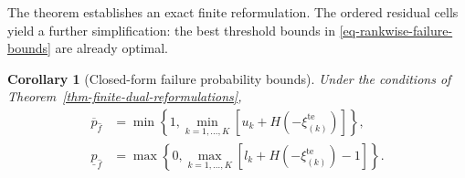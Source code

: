 \documentclass[review,11pt,3p,authoryear,nopreprintline]{elsarticle}
\newtheorem{corollary}{Corollary}
\begin{document}
The theorem establishes an exact finite reformulation. The ordered residual cells yield a further simplification: the best threshold bounds in \eqref{eq-rankwise-failure-bounds} are already optimal.

\begin{corollary}[Closed-form failure probability bounds]
  \label{thm-closed-form-bounds}
  Under the conditions of Theorem~\ref{thm-finite-dual-reformulations},
  \begin{align}
    \overline p_{\hat f}
    &=\min\left\{1,\min_{k=1,\ldots,K}[u_k+H\left(-\xi_{(k)}^{\mathrm{te}}\right)]\right\},
    \label{eq-dw-closed-upper}\\
    \underline p_{\hat f}
    &=\max\left\{0,\max_{k=1,\ldots,K}[l_k+H\left(-\xi_{(k)}^{\mathrm{te}}\right)-1]\right\}.
    \label{eq-dw-closed-lower}
  \end{align}
\end{corollary}
\end{document}
